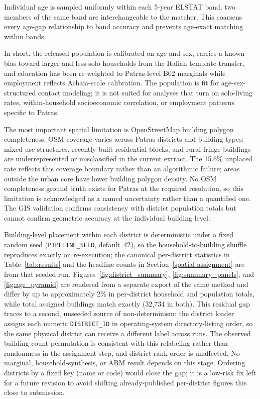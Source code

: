 \documentclass{article}
\begin{document}
Individual age is sampled uniformly within each 5-year ELSTAT band; two members of the same band are interchangeable to the matcher. This coarsens every age-gap relationship to band accuracy and prevents age-exact matching within bands.

In short, the released population is calibrated on age and sex, carries a known bias toward larger and less-solo households from the Italian template transfer, and education has been re-weighted to Patras-level B02 marginals while employment reflects Achaia-scale calibration. The population is fit for age-sex-structured contact modeling; it is not suited for analyses that turn on solo-living rates, within-household socioeconomic correlation, or employment patterns specific to Patras.

The most important spatial limitation is OpenStreetMap building polygon completeness. OSM coverage varies across Patras districts and building types: mixed-use structures, recently built residential blocks, and rural-fringe buildings are underrepresented or misclassified in the current extract. The 15.6\% unplaced rate reflects this coverage boundary rather than an algorithmic failure; areas outside the urban core have lower building polygon density. No OSM completeness ground truth exists for Patras at the required resolution, so this limitation is acknowledged as a named uncertainty rather than a quantified one. The GIS validation confirms consistency with district population totals but cannot confirm geometric accuracy at the individual building level.

Building-level placement within each district is deterministic under a fixed random seed (\texttt{PIPELINE\_SEED}, default~42), so the household-to-building shuffle reproduces exactly on re-execution; the canonical per-district statistics in Table~\ref{tab:results} and the headline counts in Section~\ref{spatial-assignment} are from that seeded run. Figures~\ref{fig:district_summary}, \ref{fig:summary_panels}, and \ref{fig:age_pyramid} are rendered from a separate export of the same method and differ by up to approximately 2\% in per-district household and population totals, while total assigned buildings match exactly (32,734 in both). This residual gap traces to a second, unseeded source of non-determinism: the district loader assigns each numeric \texttt{DISTRICT\_ID} in operating-system directory-listing order, so the same physical district can receive a different label across runs. The observed building-count permutation is consistent with this relabeling rather than randomness in the assignment step, and district rank order is unaffected. No marginal, household-synthesis, or ABM result depends on this stage. Ordering districts by a fixed key (name or code) would close the gap; it is a low-risk fix left for a future revision to avoid shifting already-published per-district figures this close to submission.
\end{document}
